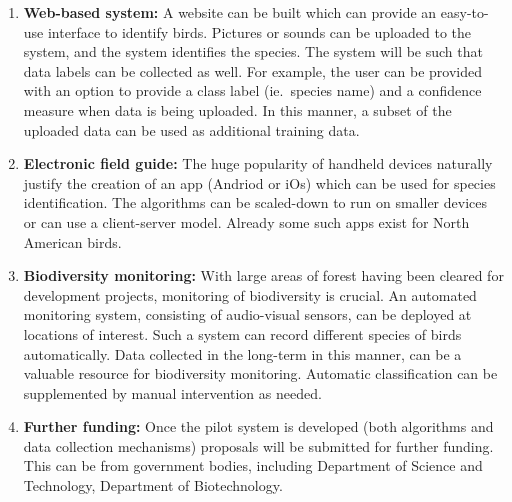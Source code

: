 \documentclass{article}
\begin{document}
\begin{enumerate}
\item \textbf{Web-based system:} A website can be built which can provide an
easy-to-use interface to identify birds. Pictures or sounds can be uploaded to
the system, and the system identifies the species. The system will be such that
data labels can be collected as well. For example, the user can be provided with
an option to provide a class label (ie.~species name) and a confidence measure
when data is being uploaded. In this manner, a subset of the uploaded data can be
used as additional training data.

\item \textbf{Electronic field guide:} The huge popularity of handheld
devices naturally justify the creation of an app (Andriod or iOs) which can be
used for species identification. The algorithms can be scaled-down to run on 
smaller devices or can use a client-server model. Already some such apps exist
for North American birds.

\item \textbf{Biodiversity monitoring:} With large areas of forest having been cleared
for development projects, monitoring of biodiversity is crucial. An automated
monitoring system, consisting of audio-visual sensors, can be deployed at
locations of interest. Such a system can record different species of birds
automatically. Data collected in the long-term in this manner, can be a
valuable resource for biodiversity monitoring. Automatic classification can be
supplemented by manual intervention as needed.

\item \textbf{Further funding:} Once the pilot system is developed (both
algorithms and data collection mechanisms) proposals will be submitted for further
funding. This can be from government bodies, including Department of Science and
Technology, Department of Biotechnology.

\end{enumerate}

\end{document}
